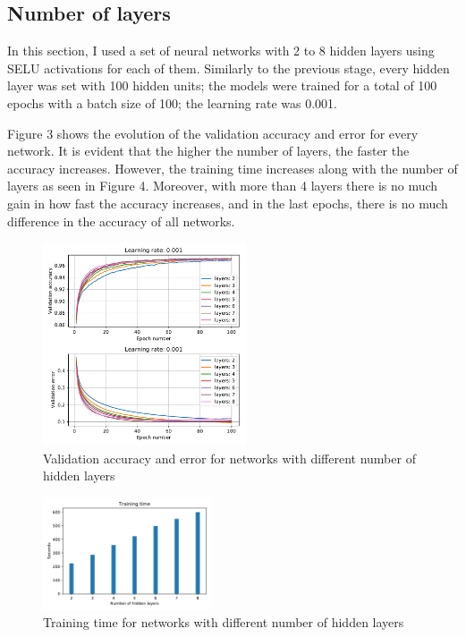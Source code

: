 \documentclass{article}
\begin{document}
\subsection{Number of layers}

In this section, I used a set of neural networks with 2 to 8 hidden layers using SELU activations for each of them. Similarly to the previous stage, every hidden layer was set with 100 hidden units; the models were trained for a total of 100 epochs with a batch size of 100; the learning rate was 0.001. 

Figure 3 shows the evolution of the validation accuracy and error for every network. It is evident that the higher the number of layers, the faster the accuracy increases. However, the training time increases along with the number of layers as seen in Figure 4. Moreover, with more than 4 layers there is no much gain in how fast the accuracy increases, and in the last epochs, there is no much difference in the accuracy of all networks.

\begin{figure}[tb]
\vskip 5mm
\begin{center}
\centerline{\includegraphics[width=60mm]{validation_acc_err_mult_layers}}
\caption{Validation accuracy and error for networks with different number of hidden layers}
\label{fig:validation_acc_err_mult_layers}
\end{center}
\vskip -5mm
\end{figure} 

\begin{figure}[tb]
\vskip 5mm
\begin{center}
\centerline{\includegraphics[width=50mm]{training_time_mult_layers}}
\caption{Training time for networks with different number of hidden layers}
\label{fig:training_time_mult_layers}
\end{center}
\vskip -5mm
\end{figure} 
\end{document}
